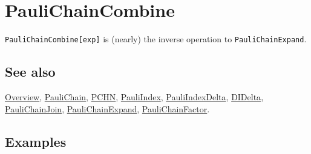 \documentclass[../FeynCalcManual.tex]{subfiles}
\begin{document}
\hypertarget{paulichaincombine}{%
\section{PauliChainCombine}\label{paulichaincombine}}

\texttt{PauliChainCombine[\allowbreak{}exp]} is (nearly) the inverse
operation to \texttt{PauliChainExpand}.

\subsection{See also}

\hyperlink{toc}{Overview}, \hyperlink{paulichain}{PauliChain},
\hyperlink{pchn}{PCHN}, \hyperlink{pauliindex}{PauliIndex},
\hyperlink{pauliindexdelta}{PauliIndexDelta},
\hyperlink{didelta}{DIDelta},
\hyperlink{paulichainjoin}{PauliChainJoin},
\hyperlink{paulichainexpand}{PauliChainExpand},
\hyperlink{paulichainfactor}{PauliChainFactor}.

\subsection{Examples}
\end{document}
